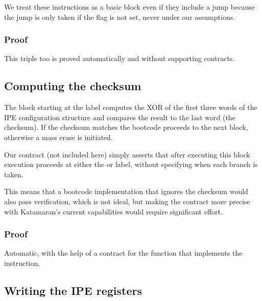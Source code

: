 We treat these instructions as a basic block even if they include a jump because the jump is only taken if the flag is not set, \ie never under our assumptions.

\subsubsection{Proof}

This triple too is proved automatically and without supporting contracts.

\subsection{Computing the checksum}

The block starting at the  label computes the XOR of the first three words of the IPE configuration structure and compares the result to the last word (the checksum). If the checksum matches the bootcode proceeds to the next block, otherwise a mass erase is initiated.

Our contract (not included here) simply asserts that after executing this block execution proceeds at either the  or  label, without specifying when each branch is taken.

This means that a bootcode implementation that ignores the checksum would also pass verification, which is not ideal, but making the contract more precise with Katamaran's current capabilities would require significant effort.

\subsubsection{Proof}

Automatic, with the help of a contract for the  function that implements the  instruction.

\subsection{Writing the IPE registers}

